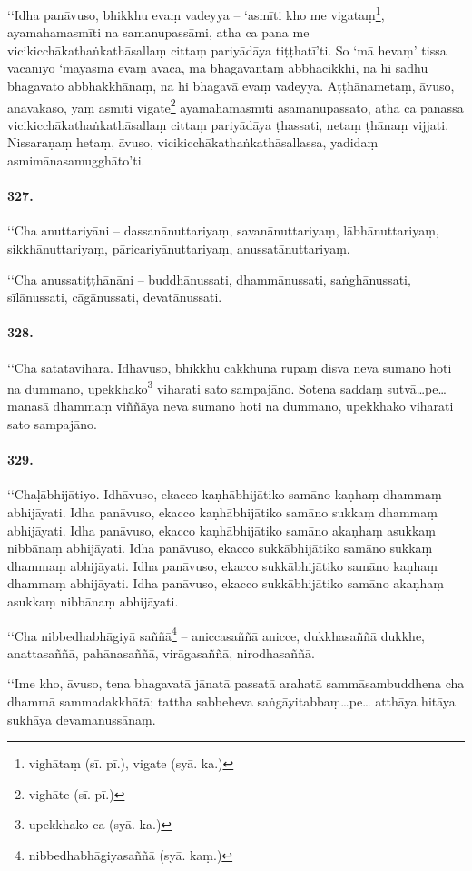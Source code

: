 ‘‘Idha panāvuso, bhikkhu evaṃ vadeyya – ‘asmīti kho me vigataṃ\footnote{vighātaṃ (sī. pī.), vigate (syā. ka.)}, ayamahamasmīti na samanupassāmi, atha ca pana me vicikicchākathaṅkathāsallaṃ cittaṃ pariyādāya tiṭṭhatī’ti. So ‘mā hevaṃ’ tissa vacanīyo ‘māyasmā evaṃ avaca, mā bhagavantaṃ abbhācikkhi, na hi sādhu bhagavato abbhakkhānaṃ, na hi bhagavā evaṃ vadeyya. Aṭṭhānametaṃ, āvuso, anavakāso, yaṃ asmīti vigate\footnote{vighāte (sī. pī.)} ayamahamasmīti asamanupassato, atha ca panassa vicikicchākathaṅkathāsallaṃ cittaṃ pariyādāya ṭhassati, netaṃ ṭhānaṃ vijjati. Nissaraṇaṃ hetaṃ, āvuso, vicikicchākathaṅkathāsallassa, yadidaṃ asmimānasamugghāto’ti.

\paragraph{327.} ‘‘Cha anuttariyāni – dassanānuttariyaṃ, savanānuttariyaṃ, lābhānuttariyaṃ, sikkhānuttariyaṃ, pāricariyānuttariyaṃ, anussatānuttariyaṃ.

‘‘Cha anussatiṭṭhānāni – buddhānussati, dhammānussati, saṅghānussati, sīlānussati, cāgānussati, devatānussati.

\paragraph{328.} ‘‘Cha satatavihārā. Idhāvuso, bhikkhu cakkhunā rūpaṃ disvā neva sumano hoti na dummano, upekkhako\footnote{upekkhako ca (syā. ka.)} viharati sato sampajāno. Sotena saddaṃ sutvā…pe… manasā dhammaṃ viññāya neva sumano hoti na dummano, upekkhako viharati sato sampajāno.

\paragraph{329.}‘‘Chaḷābhijātiyo. Idhāvuso, ekacco kaṇhābhijātiko samāno kaṇhaṃ dhammaṃ abhijāyati. Idha panāvuso, ekacco kaṇhābhijātiko samāno sukkaṃ dhammaṃ abhijāyati. Idha panāvuso, ekacco kaṇhābhijātiko samāno akaṇhaṃ asukkaṃ nibbānaṃ abhijāyati. Idha panāvuso, ekacco sukkābhijātiko samāno sukkaṃ dhammaṃ abhijāyati. Idha panāvuso, ekacco sukkābhijātiko samāno kaṇhaṃ dhammaṃ abhijāyati. Idha panāvuso, ekacco sukkābhijātiko samāno akaṇhaṃ asukkaṃ nibbānaṃ abhijāyati.

‘‘Cha nibbedhabhāgiyā saññā\footnote{nibbedhabhāgiyasaññā (syā. kaṃ.)} – aniccasaññā anicce, dukkhasaññā dukkhe, anattasaññā, pahānasaññā, virāgasaññā, nirodhasaññā.

‘‘Ime kho, āvuso, tena bhagavatā jānatā passatā arahatā sammāsambuddhena cha dhammā sammadakkhātā; tattha sabbeheva saṅgāyitabbaṃ…pe… atthāya hitāya sukhāya devamanussānaṃ.

